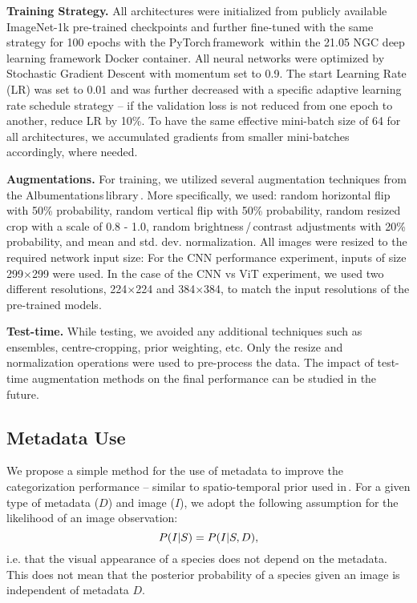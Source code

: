 \documentclass[10pt,twocolumn,letterpaper]{article}
\begin{document}
\textbf{Training Strategy.} All architectures were initialized from publicly available ImageNet-1k pre-trained checkpoints and further fine-tuned with the same strategy for 100 epochs with the PyTorch\,framework\,\cite{PyTorch} within the 21.05 NGC deep learning framework Docker container. All neural networks were optimized by Stochastic Gradient Descent with momentum set to 0.9. The start Learning Rate (LR) was set to 0.01 and was further decreased with a specific adaptive learning rate schedule strategy -- if the validation loss is not reduced from one epoch to another, reduce LR by 10\%. To have the same effective mini-batch size of 64 for all architectures, we accumulated gradients from smaller mini-batches accordingly, where needed.

\textbf{Augmentations.} For training, we utilized several augmentation techniques from the Albumentations\,library\,\cite{albumentation}. More specifically, we used: random horizontal flip with 50\% probability, random vertical flip with 50\% probability, random resized crop with a scale of 0.8 - 1.0, random brightness\,/\,contrast adjustments with 20\% probability, and mean and std. dev. normalization. All images were resized to the required network input size: For the CNN performance experiment, inputs of size 299$\times$299 were used. In the case of the CNN vs ViT experiment, we used two different resolutions, 224$\times$224 and 384$\times$384, to match the input resolutions of the pre-trained models.

\textbf{Test-time.} While testing, we avoided any additional techniques such as ensembles, centre-cropping, prior weighting, etc. Only the resize and normalization operations were used to pre-process the data. The impact of test-time augmentation methods on the final performance can be studied in the future.

\subsection{Metadata Use}
\label{metadata_usage}
We propose a simple method for the use of metadata to improve the categorization performance -- similar to spatio-temporal prior used in\,\cite{dataset-birdsnap}.
For a given type of metadata ($D$) and image ($I$), we adopt the following assumption for the likelihood of an image observation: \begin{equation}
\small
P(I|S) = P(I|S,D),
\label{eq:assumption}
\end{equation}
i.e. that the visual appearance of a species does not depend on the metadata.
This does not mean that the posterior probability of a species given an image is independent of metadata $D$.
\end{document}
